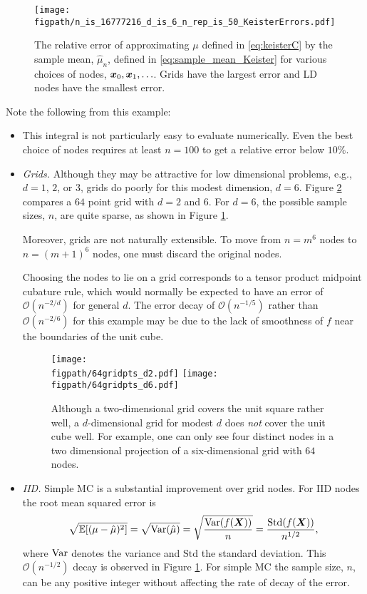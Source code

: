 \documentclass{svproc}
\newcommand{\figpath}{Figures}
\begin{document}
\begin{figure}
	\centering
	\texttt{[image: \\figpath/n\_is\_16777216\_d\_is\_6\_n\_rep\_is\_50\_KeisterErrors.pdf]}
	\caption{The relative error of approximating $\mu$ defined in \eqref{eq:keisterC} by the sample mean, $\hat{\mu}_n$, defined in \eqref{eq:sample_mean_Keister} for various choices of nodes, ${\boldsymbol{x}}_0, {\boldsymbol{x}}_1, \ldots$.  Grids have the largest error and LD nodes have the smallest error. \label{fig:keister-err}}
\end{figure}

Note the following from this example:
\begin{itemize}
	\item This integral is not particularly easy to evaluate numerically.  Even the best choice of nodes requires at least $n=100$ to get a relative error below $10\%$.

	\item \emph{Grids.} Although they may be attractive for low dimensional problems, e.g., $d = 1$, $2$, or $3$, grids do poorly for this modest dimension, $d=6$.  Figure \ref{fig:grid} compares a $64$ point grid with $d = 2$ and $6$.  For $d = 6$, the possible sample sizes, $n$, are quite sparse, as shown in Figure \ref{fig:keister-err}.

    Moreover, grids are not naturally extensible.  To move from $n = m^6$ nodes to $n = (m+1)^6$ nodes, one must discard the original nodes.

	Choosing the nodes to lie on a grid corresponds to a tensor product midpoint cubature rule, which would normally be expected to have an error of $\mathcal{O}(n^{-2/d})$  for general $d$.  The error decay of $\mathcal{O}(n^{-1/5})$ rather than $\mathcal{O}(n^{-2/6})$ for this example may be due to the lack of smoothness of $f$ near the boundaries of the unit cube.
\begin{figure}
	\centering
	\texttt{[image: \\figpath/64gridpts\_d2.pdf]}\qquad
	\texttt{[image: \\figpath/64gridpts\_d6.pdf]}
	\caption{Although a two-dimensional grid covers the unit square rather well, a $d$-dimensional grid for modest $d$ does \emph{not} cover the unit cube well.  For example, one can only see four distinct nodes in a two dimensional projection of a six-dimensional grid with $64$ nodes. \label{fig:grid}}
\end{figure}

	\item \emph{IID.}  Simple MC is a substantial improvement over grid nodes. For IID nodes the root mean squared error is
	\begin{equation}\label{eq:IIDerror}
		\sqrt{\mathbb{E}[(\mu - \hat{\mu})^2]} = \sqrt{\operatorname{Var}(\hat{\mu})} = \sqrt{\frac{\operatorname{Var}(f({\boldsymbol{X}}))}{n}} = \frac{\mathrm{Std}(f({\boldsymbol{X}}))}{n^{1/2}},
	\end{equation}
	where $\operatorname{Var}$ denotes the variance and $\mathrm{Std}$ the standard deviation.  This $\mathcal{O}(n^{-1/2})$ decay is observed in Figure \ref{fig:keister-err}. For simple MC the sample size, $n$, can be any positive integer without affecting the rate of decay of the error.


\end{itemize}
\end{document}
